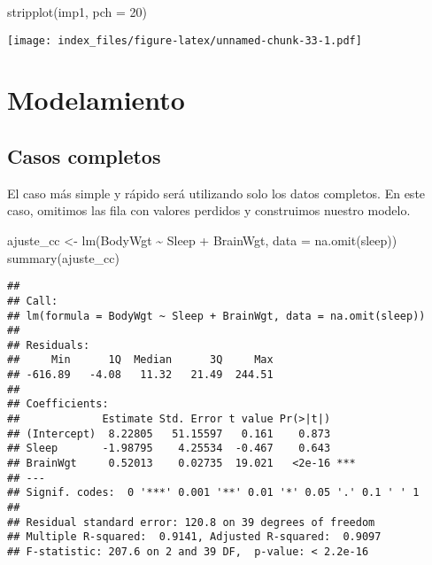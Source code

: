\documentclass[
]{article}
\newenvironment{Shaded}{\begin{snugshade}}{\end{snugshade}}
\newcommand{\AttributeTok}[1]{\textcolor[rgb]{0.77,0.63,0.00}{#1}}
\newcommand{\DecValTok}[1]{\textcolor[rgb]{0.00,0.00,0.81}{#1}}
\newcommand{\FunctionTok}[1]{\textcolor[rgb]{0.00,0.00,0.00}{#1}}
\newcommand{\NormalTok}[1]{#1}
\newcommand{\OtherTok}[1]{\textcolor[rgb]{0.56,0.35,0.01}{#1}}
\newcommand{\SpecialCharTok}[1]{\textcolor[rgb]{0.00,0.00,0.00}{#1}}
\begin{document}
\begin{Shaded}
\begin{Highlighting}[]
\FunctionTok{stripplot}\NormalTok{(imp1, }\AttributeTok{pch =} \DecValTok{20}\NormalTok{)}
\end{Highlighting}
\end{Shaded}

\texttt{[image: index\_files/figure-latex/unnamed-chunk-33-1.pdf]}

\hypertarget{modelamiento}{%
\section{Modelamiento}\label{modelamiento}}

\hypertarget{casos-completos}{%
\subsection{Casos completos}\label{casos-completos}}

El caso más simple y rápido será utilizando solo los datos completos. En
este caso, omitimos las fila con valores perdidos y construimos nuestro
modelo.

\begin{Shaded}
\begin{Highlighting}[]
\NormalTok{ajuste\_cc }\OtherTok{\textless{}{-}} \FunctionTok{lm}\NormalTok{(BodyWgt }\SpecialCharTok{\textasciitilde{}}\NormalTok{ Sleep }\SpecialCharTok{+}\NormalTok{ BrainWgt, }
                \AttributeTok{data =} \FunctionTok{na.omit}\NormalTok{(sleep))}
\FunctionTok{summary}\NormalTok{(ajuste\_cc)}
\end{Highlighting}
\end{Shaded}

\begin{verbatim}
## 
## Call:
## lm(formula = BodyWgt ~ Sleep + BrainWgt, data = na.omit(sleep))
## 
## Residuals:
##     Min      1Q  Median      3Q     Max 
## -616.89   -4.08   11.32   21.49  244.51 
## 
## Coefficients:
##             Estimate Std. Error t value Pr(>|t|)    
## (Intercept)  8.22805   51.15597   0.161    0.873    
## Sleep       -1.98795    4.25534  -0.467    0.643    
## BrainWgt     0.52013    0.02735  19.021   <2e-16 ***
## ---
## Signif. codes:  0 '***' 0.001 '**' 0.01 '*' 0.05 '.' 0.1 ' ' 1
## 
## Residual standard error: 120.8 on 39 degrees of freedom
## Multiple R-squared:  0.9141, Adjusted R-squared:  0.9097 
## F-statistic: 207.6 on 2 and 39 DF,  p-value: < 2.2e-16
\end{verbatim}
\end{document}
